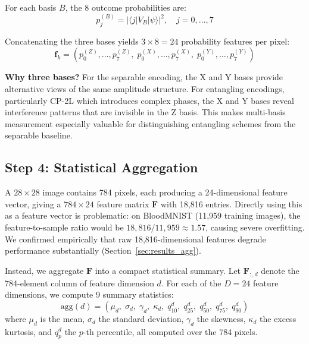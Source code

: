 \documentclass[conference,compsoc]{IEEEtran}
\begin{document}
For each basis $B$, the 8 outcome probabilities are:
\begin{equation}
    p_j^{(B)} = |\langle j | V_B | \psi \rangle|^2, \quad j = 0, \ldots, 7
    \label{eq:probs}
\end{equation}

Concatenating the three bases yields $3 \times 8 = 24$ probability features per pixel:
\begin{equation}
    \mathbf{f}_k = (p_0^{(Z)}, \ldots, p_7^{(Z)},\; p_0^{(X)}, \ldots, p_7^{(X)},\; p_0^{(Y)}, \ldots, p_7^{(Y)})
    \label{eq:features_per_pixel}
\end{equation}

\textbf{Why three bases?}
For the separable encoding, the X and Y bases provide alternative views of the same amplitude structure.
For entangling encodings, particularly CP-2L which introduces complex phases, the X and Y bases reveal interference patterns that are invisible in the Z basis.
This makes multi-basis measurement especially valuable for distinguishing entangling schemes from the separable baseline.

\subsection{Step 4: Statistical Aggregation}
\label{sec:aggregation}

A $28 \times 28$ image contains 784 pixels, each producing a 24-dimensional feature vector, giving a $784 \times 24$ feature matrix $\mathbf{F}$ with 18,816 entries.
Directly using this as a feature vector is problematic: on BloodMNIST (11,959 training images), the feature-to-sample ratio would be $18{,}816 / 11{,}959 \approx 1.57$, causing severe overfitting.
We confirmed empirically that raw 18,816-dimensional features degrade performance substantially (Section~\ref{sec:results_agg}).

Instead, we aggregate $\mathbf{F}$ into a compact statistical summary.
Let $\mathbf{F}_{:,d}$ denote the 784-element column of feature dimension $d$.
For each of the $D = 24$ feature dimensions, we compute 9 summary statistics:
\begin{equation}
    \text{agg}(d) = \left(\mu_d,\; \sigma_d,\; \gamma_d,\; \kappa_d,\; q_{10}^d,\; q_{25}^d,\; q_{50}^d,\; q_{75}^d,\; q_{90}^d\right)
    \label{eq:agg_stats}
\end{equation}
where $\mu_d$ is the mean, $\sigma_d$ the standard deviation, $\gamma_d$ the skewness, $\kappa_d$ the excess kurtosis, and $q_p^d$ the $p$-th percentile, all computed over the 784 pixels.
\end{document}
